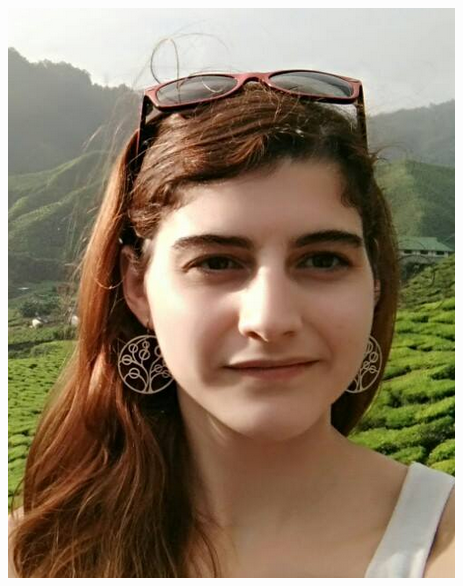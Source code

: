 \documentclass[paper=a4,fontsize=11pt]{temp} %
\begin{document}
\sepspace
\begin{minipage}{.15\linewidth}
   \includegraphics[width=\textwidth]{ana}
\end{minipage}      
\end{document}
